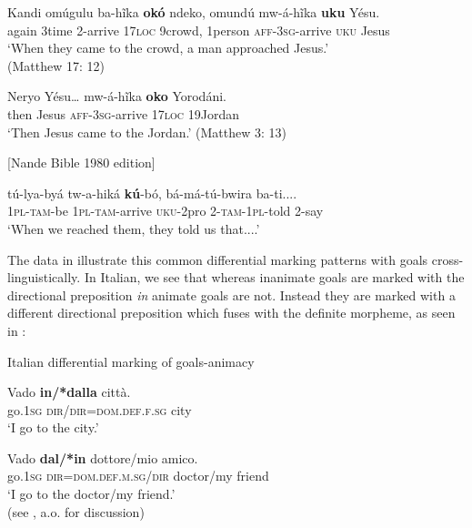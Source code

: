 \documentclass[output=paper]{langscibook}
\begin{document}
\ea \label{ex:schneider:ukuandoko}
\begin{xlist}

\ex \label{ex:schneider:uku}
\gll Kandi  omúgulu  ba-h\~ika \textbf{ok\'o} ndeko, omundú  mw-á-h\~ika \textbf{uku} Y\'esu. \\
again 3time 2-arrive 17\textsc{loc} 9crowd,  1person \textsc{aff-3sg-}arrive  \textsc{uku} Jesus \\
\glt `When they came to the crowd, a man approached Jesus.' \\
(Matthew 17: 12)

\ex \label{ex:schneider:oko}
\gll Neryo Y\'esu… mw-á-h\~ika \textbf{oko} Yorodáni. \\
then Jesus \textsc{aff-3sg-}arrive  17\textsc{loc} 19Jordan \\
\glt `Then Jesus came to the Jordan.'  (Matthew 3: 13) 

[Nande Bible 1980 edition]

\ex \label{ex:schneider:ko}
\gll tú-lya-byá tw-a-hiká \textbf{kú}-b\'o,    bá-má-tú-bwira ba-ti.... \\
\textsc{1pl-tam-}be \textsc{1pl-tam-}arrive \textsc{uku}-2pro \textsc{2-tam-1pl-}told 2-say
 \\
\glt `When we reached them, they told us that....' 

\end{xlist}

\z 

The data in  illustrate this common differential marking patterns with goals cross-linguistically. In Italian, we see that whereas inanimate goals are marked with the directional preposition \textit{in}  animate goals are not. Instead they are marked with a different directional preposition which fuses with the definite morpheme, as seen in : 

\ea \label{ex:schneider:Italian}
Italian differential marking of goals-animacy
\begin{xlist}

\ex \label{ex:schneider:Italianinanimate}
\gll Vado    \textbf{in/*dalla}      citt\`a. \\
go.\textsc{1sg}  \textsc{dir/dir=dom.def.f.sg}    city \\
\glt `I go to the city.'

\ex \label{ex:schneider:Italiananimate}
\gll Vado  \textbf{dal/*in}  dottore/mio amico. \\
go.\textsc{1sg} \textsc{dir=dom.def.m.sg/dir}  doctor/my friend \\
\glt  `I go to the doctor/my friend.'\\
(see \citeauthor{FrancoManzini2017} \citeyear{FrancoManzini2017}, a.o. for discussion)

\end{xlist}
\end{document}
